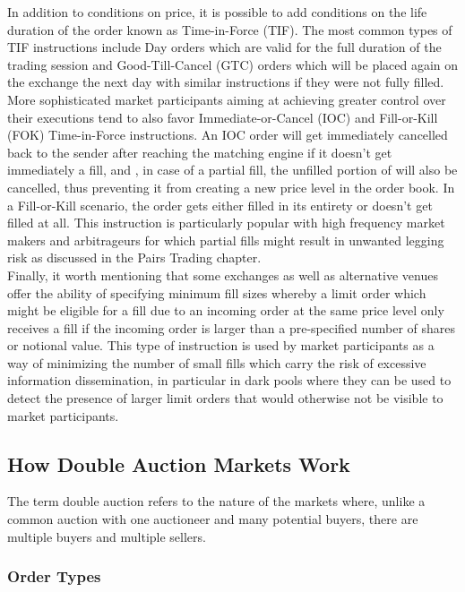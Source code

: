 In addition to conditions on price, it is possible to add conditions on the life duration of the order known as Time-in-Force (TIF). The most common types of TIF instructions include Day orders which are valid for the full duration of the trading session and Good-Till-Cancel (GTC) orders which will be placed again on the exchange the next day with similar instructions if they were not fully filled. More sophisticated market participants aiming at achieving greater control over their executions tend to also favor Immediate-or-Cancel (IOC) and Fill-or-Kill (FOK) Time-in-Force instructions. An IOC order will get immediately cancelled back to the sender after reaching the matching engine if it doesn't get immediately a fill, and , in case of a partial fill, the unfilled portion of will also be cancelled, thus preventing it from creating a new price level in the order book. In a Fill-or-Kill scenario, the order gets either filled in its entirety or doesn't get filled at all. This instruction is particularly popular with high frequency market makers and arbitrageurs for which partial fills might result in unwanted legging risk as discussed in the Pairs Trading chapter. \\

Finally, it worth mentioning that some exchanges as well as alternative venues offer the ability of specifying minimum fill sizes whereby a limit order which might be eligible for a fill due to an incoming order at the same price level only receives a fill if the incoming order is larger than a pre-specified number of shares or notional value. This type of instruction is used by market participants as a way of minimizing the number of small fills which carry the risk of excessive information dissemination, in particular in dark pools where they can be used to detect the presence of larger limit orders that would otherwise not be visible to market participants.  

\subsection{How Double Auction Markets Work}

The term double auction refers to the nature of the markets where, unlike a common auction with one auctioneer and many potential buyers, there are multiple buyers and multiple sellers.



\subsubsection{Order Types}

